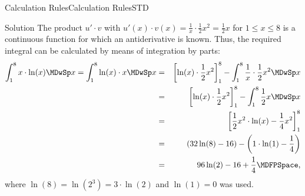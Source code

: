 \begin{MXContent}{Calculation Rules}{Calculation Rules}{STD}
\begin{MCOSHZusatz}
\begin{MExercise}
\begin{MHint}{Solution}
The product $u' \cdot v$ with $u'(x) \cdot v(x) = \frac{1}{x} \cdot \frac{1}{2} x^2 = \frac{1}{2} x$  for 
$1 \leq x \leq 8$ is a continuous function for which an antiderivative is known. Thus, 
the required integral can be calculated by means of integration by parts:
\begin{eqnarray*}
\int_{1}^{8} x \cdot \ln(x) \MDwSp x %
 = \int_{1}^{8} \ln(x) \cdot x \MDwSp x %
& = & \left[ \ln(x) \cdot \frac{1}{2} x^2 \right]_{1}^{8} %
      - \int_{1}^{8} \frac{1}{x} \cdot \frac{1}{2} x^2 \MDwSp x \\
& = & \left[ \ln(x) \cdot \frac{1}{2} x^2 \right]_{1}^{8} %
      - \int_{1}^{8} \frac{1}{2} x \MDwSp x \\
& = & \left[ \frac{1}{2} x^2 \cdot \ln(x) - \frac{1}{4} x^2 \right]_{1}^{8} \\
& = & \left(32 \ln(8) - 16\right) - \left(1 \cdot \ln(1) - \frac{1}{4}\right) \\
& = & 96 \ln(2) - 16 + \frac{1}{4} \MDFPSpace , %
\end{eqnarray*}
where $\ln(8) = \ln(2^3) = 3 \cdot \ln(2)$ and $\ln(1) = 0$ was used.
\end{MHint}
\end{MExercise}
\end{MCOSHZusatz}

\end{MXContent}


